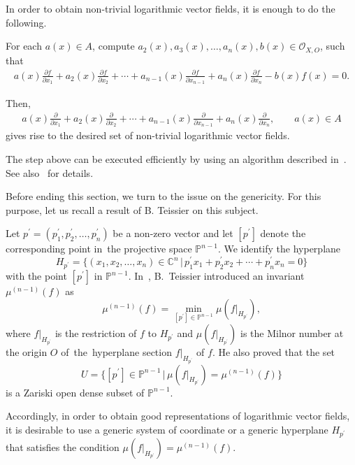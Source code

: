 \documentclass[pdftex]{sigma}%
\numberwithin{equation}{section}
\begin{document}
In order to obtain non-trivial logarithmic vector fields, it is enough to do the following.

For each $a(x) \in A$, compute $a_2(x), a_3(x),\ldots,a_n(x), b(x) \in {\mathcal O}_{X,O}$, such that
\begin{gather*}
a(x)\frac{\partial f}{\partial x_1} + a_2(x)\frac{\partial f}{\partial x_2} + \cdots + a_{n-1}(x)\frac{\partial f}{\partial x_{n-1}}+ a_n(x)\frac{\partial f}{\partial x_n} - b(x)f(x) =0.
\end{gather*}

{\samepage
Then,
\begin{gather*}
a(x)\frac{\partial }{\partial x_1} + a_2(x)\frac{\partial }{\partial x_2} + \cdots + a_{n-1}(x)\frac{\partial }{\partial x_{n-1}}+ a_n(x)\frac{\partial }{\partial x_n}, \qquad a(x) \in A
\end{gather*}
gives rise to the desired set of non-trivial logarithmic vector fields.

}

The step above can be executed efficiently by using an algorithm described in~\cite{NT16b}. See also~\cite{TN20} for details.


Before ending this section, we turn to the issue on the genericity. For this purpose, let us recall a result of B. Teissier on this subject.

Let $ p^{\prime}= (p_1^{\prime}, p_2^{\prime}, \dots, p_n^{\prime}) $ be a non-zero vector and let $ [p^{\prime}] $ denote
the corresponding point in~the projective space $ {\mathbb P}^{n-1}$. We identify the hyperplane
\[
H_{p^{\prime}} = \big\{ (x_1,x_2,\dots, x_n) \in {\mathbb C}^{n} \,|\, p_1^{\prime}x_1+p_2^{\prime}x_2+ \cdots + p_n^{\prime}x_n =0 \big\}
\]
with the point $ [p^{\prime}] $ in $ {\mathbb P}^{n-1}$.
In~\cite{Te73, Te77}, B.~Teissier introduced an invariant $ \mu^{(n-1)}(f) $ as
\[
\mu^{(n-1)}(f) = \min_{[p^{\prime}] \in {\mathbb P}^{n-1}} \mu(f|_{H_{p^{\prime}}}),
\]
where $ f|_{H_{p^{\prime}}} $ is the restriction of $f$ to $ H_{p^{\prime}} $ and
$ \mu(f|_{H_{p^{\prime}}}) $ is the Milnor number at the origin $O$ of~the~hyperplane section $ f|_{H_{p^{\prime}}} $ of $f $.
He also proved that the set
\[
U=\big\{[p^{\prime}] \in {\mathbb P}^{n-1} \,|\, \mu(f|_{H_{p^{\prime}}}) = \mu^{(n-1)}(f)\big\}
\]
is a Zariski open dense subset of $ {\mathbb P}^{n-1}$.

Accordingly, in order to obtain good representations of logarithmic vector fields, it is desirable to use a generic system of coordinate or a generic hyperplane $H_{p^{\prime}}$ that satisfies the condition $\mu(f|_{H_{p^{\prime}}}) = \mu^{(n-1)}(f)$.
\end{document}
